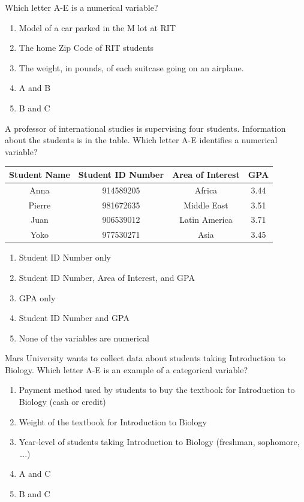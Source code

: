 \documentclass[11.5pt]{sig-alternate} %
\begin{document}
\begin{large}
Which letter A-E is a numerical variable?
\begin{enumerate}[label=\Alph*.]
    \item Model of a car parked in the M lot at RIT
    \item The home Zip Code of RIT students
    \item The weight, in pounds, of each suitcase going on an airplane.
    \item A and B
    \item B and C
\end{enumerate}

A professor of international studies is supervising four students. Information about the students is in the table. Which letter A-E identifies a numerical variable?

\begin{table}[h]
\centering
\begin{tabular}{|c|c|c|c|}
\hline
Student Name & Student ID Number & Area of Interest & GPA\\ \hline
Anna & 914589205 & Africa & 3.44 \\ \hline
Pierre & 981672635 & Middle East & 3.51 \\ \hline
Juan & 906539012 & Latin America & 3.71 \\ \hline
Yoko & 977530271 & Asia & 3.45 \\ \hline
\end{tabular}
\end{table}

\begin{enumerate}[label=\Alph*.]
    \item Student ID Number only
    \item Student ID Number, Area of Interest, and GPA
    \item GPA only
    \item Student ID Number and GPA
    \item None of the variables are numerical
\end{enumerate}

Mars University wants to collect data about students taking Introduction to Biology. Which letter A-E is an example of a categorical variable?
\begin{enumerate}[label=\Alph*.]
    \item Payment method used by students to buy the textbook for Introduction to Biology (cash or credit)
    \item Weight of the textbook for Introduction to Biology
    \item Year-level of students taking Introduction to Biology (freshman, sophomore, ….)
    \item A and C
    \item B and C
\end{enumerate}


\end{large}
\end{document}
